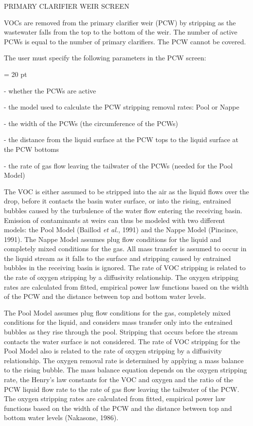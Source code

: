 PRIMARY CLARIFIER WEIR SCREEN

VOCs are removed from the primary clarifier weir (PCW) by stripping as the
wastewater falls from the top to the bottom of the weir.  The number of active
PCWs is equal to the number of primary clarifiers. The PCW cannot be covered.

The user must specify the following parameters in the PCW screen:

{\parindent = 20 pt

\item{-} whether the PCWs are active 

\item{-} the model used to calculate the PCW stripping removal rates: Pool or
Nappe

\item{-} the width of the PCWs (the circumference of the PCWs)

\item{-} the distance from the liquid surface at the PCW tops to the liquid
surface at the PCW bottoms 

\item{-} the rate of gas flow leaving the tailwater of the PCWs (needed for the
Pool Model)

}

The VOC is either assumed to be stripped into the air as the liquid flows over
the drop, before it contacts the basin water surface, or into the rising,
entrained bubbles caused by the turbulence of the water flow entering the
receiving basin.  Emission of contaminants at weirs can thus be modeled with
two different models: the Pool Model (Baillod  {\it et al.}, 1991) and the
Nappe Model (Pincince, 1991).  The Nappe Model assumes plug flow conditions for
the liquid and completely mixed conditions for the gas.   All mass transfer is
assumed to occur in the liquid stream as it falls to the surface and stripping
caused by entrained bubbles in the receiving basin is ignored.  The rate of VOC
stripping is related to the rate of oxygen stripping by a diffusivity
relationship.  The oxygen stripping rates are calculated from fitted, empirical
power law functions based on the width of the PCW and the distance between top
and bottom water levels.

The Pool Model assumes plug flow conditions for the gas, completely mixed
conditions for the liquid, and considers mass transfer only into the entrained
bubbles as they rise through the pool.  Stripping that occurs before the stream
contacts the water surface is not considered.  The rate of VOC stripping for
the Pool Model also is related to the rate of oxygen stripping by a diffusivity
relationship.  The oxygen removal rate is determined by applying a mass balance
to the rising bubble. The mass balance equation depends on the oxygen stripping
rate, the Henry's law constants for the VOC and oxygen and the ratio of the PCW
liquid flow rate to the rate of gas flow leaving the tailwater of the PCW. The
oxygen stripping rates are calculated from fitted, empirical power law
functions based on the width of the PCW and the distance between top and bottom
water levels (Nakasone, 1986). 

